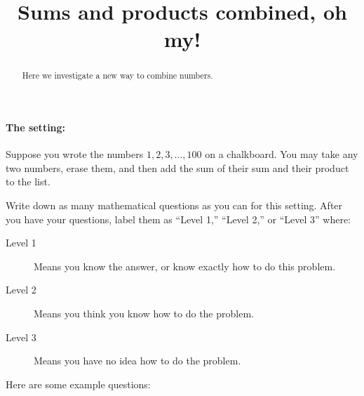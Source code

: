 \documentclass[handout,nooutcomes]{ximera}
\title{Sums and products combined, oh my!}
\begin{document}
\begin{abstract}
Here we investigate a new way to combine numbers.
\end{abstract}
\maketitle

\paragraph{The setting:}

Suppose you wrote the numbers $1,2,3,\dots,100$ on a chalkboard. You
may take any two numbers, erase them, and then add the sum of their
sum and their product to the list.

\begin{problem}
     Write down as many mathematical questions as you can for this
     setting. After you have your questions, label them as ``Level
     1,'' ``Level 2,'' or ``Level 3'' where:
\begin{description}
\item[Level 1] Means you know the answer, or know exactly how to do
  this problem.
\item[Level 2] Means you think you know how to do the problem.
\item[Level 3] Means you have no idea how to do the problem.
\end{description}
\begin{freeResponse}
  Here are some example questions:

\end{freeResponse}
\end{problem}
\end{document}
